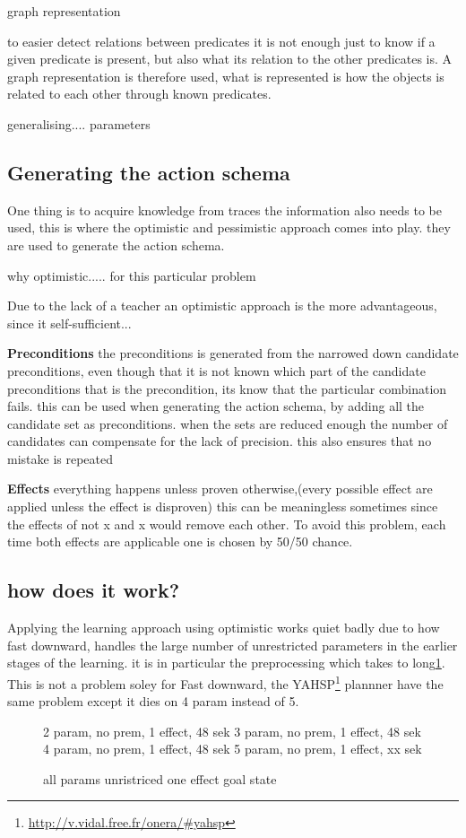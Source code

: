 	graph representation
	
	to easier detect relations between predicates it is not enough just to know if a given predicate is present, but also what its relation to the other predicates is. A graph representation is therefore used, what is represented is how the objects is related to each other through known predicates.


	generalising.... parameters
\subsection{Generating the action schema}
One thing is to acquire knowledge from traces the information also needs to be used, this is where the optimistic and pessimistic approach comes into play. 
they are used to generate the action schema.

why optimistic..... for this particular problem

Due to the lack of a teacher an  optimistic approach is the more advantageous, since it self-sufficient...


\textbf{Preconditions}
the preconditions is generated from the narrowed down candidate preconditions, even though that it is not known which part of the candidate preconditions that is the precondition, its know that the particular combination fails. this can be used when generating the action schema, by adding all the candidate set as preconditions. when the sets are reduced enough the number of candidates can compensate for the lack of precision. this also ensures that no mistake is repeated


\textbf{Effects}
everything happens unless proven otherwise,(every possible effect are applied unless the effect is disproven) this can be meaningless sometimes since the effects of not x and x would remove each other. To avoid this problem, each time both effects are applicable one is chosen by 50/50 chance.
\subsection{how does it work?}
Applying the learning approach using optimistic works quiet badly due to how fast downward, handles the large number of unrestricted parameters in the earlier stages of the learning. it is in particular the preprocessing which takes to long\ref{opt-fd}. This is not a problem soley for Fast downward, the YAHSP\footnote{\url{http://v.vidal.free.fr/onera/\#yahsp}} plannner have the same problem except it dies on 4 param instead of 5.
\begin{figure}
	\label{opt-fd}
	2 param, no prem, 1 effect, 48 sek
	3 param, no prem, 1 effect, 48 sek
	4 param, no prem, 1 effect, 48 sek
	5 param, no prem, 1 effect, xx sek
	
	all params unristriced
	one effect goal state
\end{figure}


